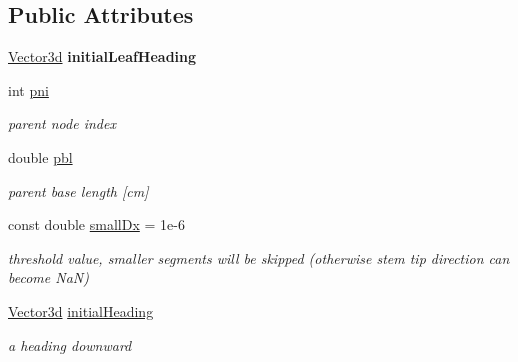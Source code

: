 \subsection*{Public Attributes}
\begin{DoxyCompactItemize}
\item 
\mbox{\label{classCPlantBox_1_1Leaf_a911070d0046fbd3c9500154ab233fb46}} 
\hyperlink{classCPlantBox_1_1Vector3d}{Vector3d} {\bfseries initial\+Leaf\+Heading}
\item 
\mbox{\label{classCPlantBox_1_1Leaf_a533cb09f68a86c55321b2b28e3f8085a}} 
int \hyperlink{classCPlantBox_1_1Leaf_a533cb09f68a86c55321b2b28e3f8085a}{pni}
\begin{DoxyCompactList}\small\item\em parent node index \end{DoxyCompactList}\item 
\mbox{\label{classCPlantBox_1_1Leaf_a7c503767ee8008fb9555f1f4590435c5}} 
double \hyperlink{classCPlantBox_1_1Leaf_a7c503767ee8008fb9555f1f4590435c5}{pbl}
\begin{DoxyCompactList}\small\item\em parent base length \mbox{[}cm\mbox{]} \end{DoxyCompactList}\item 
\mbox{\label{classCPlantBox_1_1Leaf_a8771659afcda26d64e7e505a006790a3}} 
const double \hyperlink{classCPlantBox_1_1Leaf_a8771659afcda26d64e7e505a006790a3}{small\+Dx} = 1e-\/6
\begin{DoxyCompactList}\small\item\em threshold value, smaller segments will be skipped (otherwise stem tip direction can become NaN) \end{DoxyCompactList}\item 
\mbox{\label{classCPlantBox_1_1Leaf_ac7f33d0e34757c888521af4da83cffad}} 
\hyperlink{classCPlantBox_1_1Vector3d}{Vector3d} \hyperlink{classCPlantBox_1_1Leaf_ac7f33d0e34757c888521af4da83cffad}{initial\+Heading}
\begin{DoxyCompactList}\small\item\em a heading downward \end{DoxyCompactList}\item 

\end{DoxyCompactItemize}
